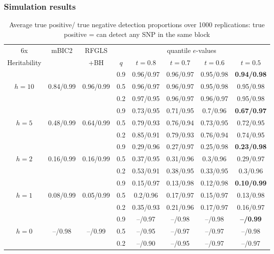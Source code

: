 \documentclass[handout,10pt]{beamer}
\begin{document}
\begin{frame}
\frametitle{Simulation results}

\begin{table}
\begin{scriptsize}
\centering
    \begin{tabular}{c|c|c|c|cccc}
    \hline
    6x    & mBIC2       & RFGLS  & \multicolumn{5}{|c}{quantile $e$-values}    \\\cline{4-8}
    Heritability    &           & +BH		 & $q$    & $t=0.8$     & $t=0.7$     & $t=0.6$     & $t=0.5$     \\ \hline
    ~    & ~         & ~         & 0.9      & 0.96/0.97 & 0.96/0.97 & 0.95/0.98 & \textbf{0.94/0.98} \\
    $h=10$ & 0.84/0.99 & 0.96/0.99 & 0.5      & 0.96/0.97 & 0.96/0.97 & 0.95/0.98 & 0.95/0.98 \\
    ~    & ~         & ~         & 0.2      & 0.97/0.95 & 0.96/0.97 & 0.96/0.97 & 0.95/0.98 \\\hline
    ~    & ~         & ~         & 0.9      & 0.73/0.95 & 0.71/0.95 & 0.7/0.96  & \textbf{0.67/0.97} \\
    $h=5$  & 0.48/0.99 & 0.64/0.99 & 0.5      & 0.79/0.93 & 0.76/0.94 & 0.73/0.95 & 0.72/0.95 \\
    ~    & ~         & ~         & 0.2      & 0.85/0.91 & 0.79/0.93 & 0.76/0.94 & 0.74/0.95 \\\hline
    ~    & ~         & ~         & 0.9      & 0.29/0.96 & 0.27/0.97 & 0.25/0.98 & \textbf{0.23/0.98} \\
    $h=2$  & 0.16/0.99 & 0.16/0.99    & 0.5      & 0.37/0.95 & 0.31/0.96 & 0.3/0.96  & 0.29/0.97 \\
    ~    & ~         & ~         & 0.2      & 0.53/0.91 & 0.38/0.95 & 0.33/0.95 & 0.3/0.96  \\\hline
    ~    & ~         & ~         & 0.9      & 0.15/0.97 & 0.13/0.98 & 0.12/0.98 & \textbf{0.10/0.99}  \\
    $h=1$  & 0.08/0.99 & 0.05/0.99    & 0.5      & 0.2/0.96  & 0.17/0.97 & 0.15/0.97 & 0.13/0.98 \\
    ~    & ~         & ~         & 0.2      & 0.35/0.93 & 0.21/0.96 & 0.17/0.97 & 0.16/0.97 \\\hline
    ~    & ~         & ~         & 0.9      & --/0.97 & --/0.98 & --/0.98 & \textbf{--/0.99} \\
    $h=0$  & --/0.98 & --/0.99    & 0.5      & --/0.95 & --/0.97 & --/0.97 & --/0.98 \\
    ~    & ~         & ~         & 0.2      & --/0.90 & --/0.95 & --/0.97 & --/0.97 \\\hline
    \end{tabular}
\caption*{Average true positive/ true negative detection proportions over 1000 replications: true positive = can detect any SNP in the same block}
\end{scriptsize}
\end{table}
\end{frame}
\end{document}
